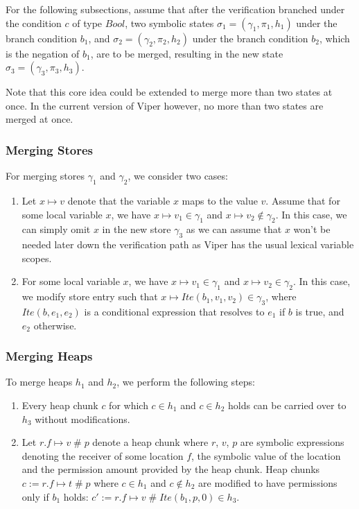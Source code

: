 \documentclass[11pt]{article}
\DeclareMathOperator{\perm}{\mathbin{\#}}
\begin{document}
    For the following subsections, assume that after the verification branched under the condition $c$ of type $Bool$,
    two symbolic states $\sigma_1 = (\gamma_1, \pi_1, h_1)$ under the branch condition $b_1$, and
    $\sigma_2 = (\gamma_2, \pi_2, h_2)$ under the branch condition $b_2$, which is the negation
    of $b_1$, are to be merged,
    resulting in the new state $\sigma_3 = (\gamma_3, \pi_3, h_3)$.

    Note that this core idea could be extended to merge more than two states at once. In 
    the current version of Viper however,
    no more than two states are merged at once.

    \subsubsection{Merging Stores}

    For merging stores $\gamma_1$ and $\gamma_2$, we consider two cases:

    \begin{enumerate}
        \item Let $x \mapsto v$ denote that the variable $x$ maps to the value $v$.
            Assume that for some local variable $x$, we have $x \mapsto v_1 \in \gamma_1$ and $x \mapsto v_2 \notin \gamma_2$.
            In this case, we can simply omit $x$ in the new store $\gamma_3$ as we can assume that $x$ won't
            be needed later down the verification path as Viper has the usual lexical
            variable scopes.
        \item For some local variable $x$, we have $x \mapsto v_1 \in \gamma_1$ and $x \mapsto v_2 \in \gamma_2$.
            In this case, we modify store entry such that $x \mapsto Ite(b_1, v_1, v_2) \in \gamma_3$,
            where $Ite(b, e_1, e_2)$ is a conditional expression that resolves to $e_1$ if $b$ is true, and $e_2$ otherwise.
    \end{enumerate}

    \subsubsection{Merging Heaps} \label{merging-the-heap}

    To merge heaps $h_1$ and $h_2$, we perform the following steps:

    \begin{enumerate}
        \item Every heap chunk $c$ for which $c \in h_1$ and $c \in h_2$ holds can be carried over to $h_3$
            without modifications.
        \item Let $r.f \mapsto v \perm p$ denote a heap chunk where $r$, $v$, $p$ are symbolic expressions
            denoting the receiver of some location $f$, the symbolic value of the location and the permission
            amount provided by the heap chunk.
            Heap chunks $c := r.f \mapsto t \perm p$ where $c \in h_1$ and $c \notin h_2$ are modified to
            have permissions only if $b_1$ holds: $c' := r.f \mapsto v \perm Ite(b_1, p, 0) \in h_3$.
    \end{enumerate}
\end{document}
